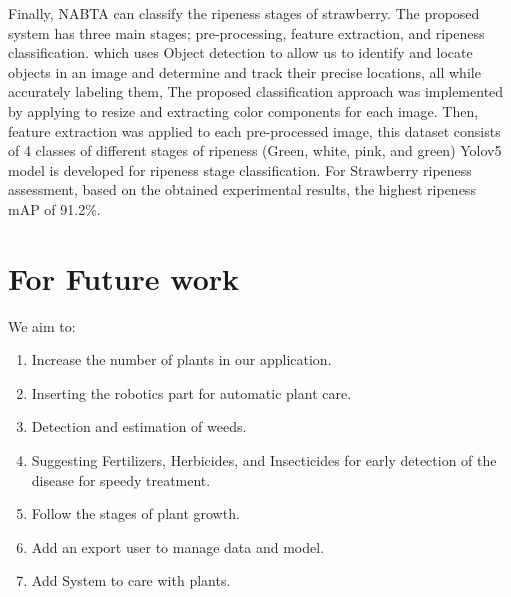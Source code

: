 Finally, NABTA can classify the ripeness stages of strawberry. The proposed 
system has three main stages; pre-processing, feature extraction, 
and ripeness classification. which uses Object detection to allow us 
to identify and locate objects in an image and determine and track their 
precise locations, all while accurately labeling them, The proposed classification 
approach was implemented by applying to resize and extracting color components 
for each image. Then, feature extraction was applied to each pre-processed image, 
this dataset consists of 4 classes of different stages of ripeness 
(Green, white, pink, and green) Yolov5 model is developed for ripeness
stage classification. For Strawberry ripeness assessment, based on the obtained
experimental results, the highest ripeness mAP of 91.2\%.

\section{For Future work}
We aim to:
\begin{enumerate}
  \item Increase the number of plants in our application.
  \item Inserting the robotics part for automatic plant care.
  \item Detection and estimation of weeds.
  \item Suggesting Fertilizers, Herbicides, and Insecticides for early detection of the disease for speedy treatment.
  \item Follow the stages of plant growth.
  \item Add an export user to manage data and model.
  \item Add System to care with plants.
\end{enumerate}
